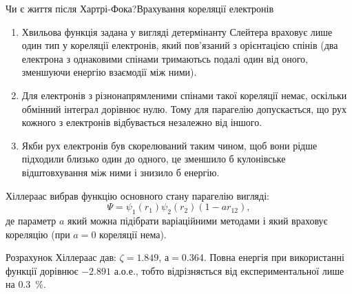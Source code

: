 \documentclass[10pt]{beamer}
\begin{document}
\begin{frame}{Чи є життя після Хартрі-Фока?}{Врахування кореляції електронів}\small

	\bigskip
	\begin{overprint}
		\begin{enumerate}[\faHandORight]
			\item Хвильова функція задана у вигляді детермінанту Слейтера враховує лише один тип у кореляції електронів, який пов'язаний з орієнтацією спінів ({\scriptsize два електрона з однаковими спінами тримаютьсь подалі один від оного, зменшуючи енергію взаємодії між ними}). \item Для електронів з різ\-но\-на\-прям\-ле\-ни\-ми спінами такої кореляції немає, оскільки обмінний інтеграл дорівнює нулю. Тому для парагелію допускається, що рух кожного з електронів відбувається незалежно від іншого.
			\item Якби рух електронів був скорелюваний таким чином, щоб вони рідше підходили близько один до одного, це зменшило б \alert{кулонівське відштовхування} між ними і знизило б енергію.
		\end{enumerate}
		Хіллераас вибрав функцію основного стану парагелію вигляді:
		\begin{equation*}\label{}
			\Psi = \psi_1(r_1)\psi_2(r_2)(1 - ar_{12}),
		\end{equation*}
		де параметр $a$ який можна підібрати варіаційними методами і який враховує кореляцію (при $a = 0$ кореляції нема).

		\medskip

		\hrulefill

		Розрахунок Хіллераас дав: $\zeta = 1.849$, $а = 0.364$. Повна енергія
		при використанні функції дорівнює $-2.891$ а.о.е., тобто відрізняється від експериментальної лише на $0.3$~\%.

		\vspace*{-1ex}
		\hrulefill



	\end{overprint}
\end{frame}
\end{document}
